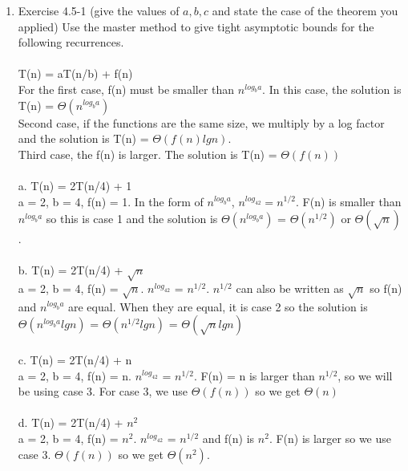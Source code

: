 \documentclass[12pt]{article}
\begin{document}
\begin{enumerate}
\item Exercise 4.5-1 (give the values of $a,b,c$ and state the case of the theorem you applied)
Use the master method to give tight asymptotic bounds for the following recurrences.\\
\\
T(n) = aT(n/b) + f(n) \\
For the first case, f(n) must be smaller than $n^{log_ba}$. In this case, the solution is T(n) = $\Theta(n^{log_ba})$\\
Second case, if the functions are the same size, we multiply by a log factor and the solution is T(n) = $\Theta(f(n)lgn).$ \\
Third case, the f(n) is larger. The solution is T(n) = $\Theta(f(n))$ \\
\\
a. T(n) = 2T(n/4) + 1 \\ 
a = 2, b = 4, f(n) = 1. In the form of $n^{log_ba}$, $n^{log_42} = n^{1/2}$. F(n) is smaller than $n^{log_ba}$ so this is case 1 and the solution is $\Theta(n^{log_ba})$ = $\Theta(n^{1/2})$ or $\Theta(\sqrt{n})$. \\
\\
b. T(n) = 2T(n/4) + $\sqrt{n}$ \\ 
a = 2, b = 4, f(n) = $\sqrt{n}$.  $n^{log_42}$ = $n^{1/2}$. $n^{1/2}$ can also be written as $\sqrt{n}$ so f(n) and $n^{log_ba}$ are equal. When they are equal, it is case 2 so the solution is $\Theta(n^{log_ba}lgn)$ = $\Theta(n^{1/2}lgn)$ = $\Theta(\sqrt{n}lgn)$\\
\\
c. T(n) = 2T(n/4) + n \\ 
a = 2, b = 4, f(n) = n. $n^{log_42}$ = $n^{1/2}$. F(n) = n is larger than $n^{1/2}$, so we will be using case 3. For case 3, we use $\Theta(f(n))$ so we get $\Theta(n)$\\
\\
d. T(n) = 2T(n/4) + $n^2$ \\
a = 2, b = 4, f(n) = $n^2$. $n^{log_42}$ = $n^{1/2}$ and f(n) is $n^2$. F(n) is larger so we use case 3.  $\Theta(f(n))$ so we get $\Theta(n^2)$.\\

\end{enumerate}
 

 
\end{document}
